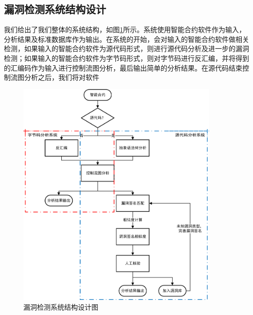 \subsection{漏洞检测系统结构设计}
我们给出了我们整体的系统结构，如图\ref{fig:system_diagram}所示。系统使用智能合约软件作为输入，分析结果及标准数据库作为输出。在系统的开始，会对输入的智能合约软件做相关检测，如果输入的智能合约软件为源代码形式，则进行源代码分析及进一步的漏洞检测；如果输入的智能合约软件为字节码形式，则对字节码进行反汇编，并将得到的汇编码作为输入进行控制流图分析，最后输出简单的分析结果。在源代码结束控制流图分析之后，我们将对软件
\begin{figure}[t]
\vspace{+2mm}
  \centering
  \includegraphics[width=0.9\textwidth]{figures/system_diagram.png}
  \caption{漏洞检测系统结构设计图}
  \label{fig:system_diagram}
\vspace{-5mm}
\end{figure}